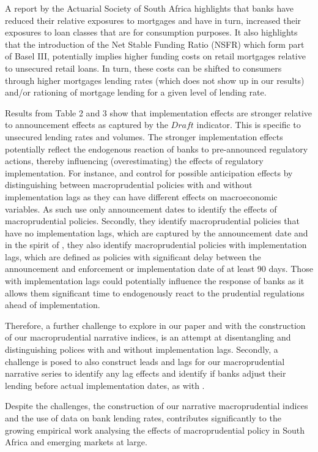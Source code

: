 \documentclass[
  letterpaper,
  DIV=11,
  numbers=noendperiod]{scrartcl}
\begin{document}
A report by the Actuarial Society of South Africa highlights that banks
have reduced their relative exposures to mortgages and have in turn,
increased their exposures to loan classes that are for consumption
purposes. It also highlights that the introduction of the Net Stable
Funding Ratio (NSFR) which form part of Basel III, potentially implies
higher funding costs on retail mortgages relative to unsecured retail
loans. In turn, these costs can be shifted to consumers through higher
mortgages lending rates (which does not show up in our results) and/or
rationing of mortgage lending for a given level of lending rate.

Results from Table 2 and 3 show that implementation effects are stronger
relative to announcement effects as captured by the \(Draft\) indicator.
This is specific to unsecured lending rates and volumes. The stronger
implementation effects potentially reflect the endogenous reaction of
banks to pre-announced regulatory actions, thereby influencing
(overestimating) the effects of regulatory implementation. For instance,
\cite{fernandez2023transmission} and \cite{fang2022bank} control for
possible anticipation effects by distinguishing between macroprudential
policies with and without implementation lags as they can have different
effects on macroeconomic variables. As such
\cite{fernandez2023transmission} use only announcement dates to identify
the effects of macroprudential policies. Secondly, they identify
macroprudential policies that have no implementation lags, which are
captured by the announcement date and in the spirit of
\cite{mertens2012empirical}, they also identify macroprudential policies
with implementation lags, which are defined as policies with significant
delay between the announcement and enforcement or implementation date of
at least 90 days. Those with implementation lags could potentially
influence the response of banks as it allows them significant time to
endogenously react to the prudential regulations ahead of
implementation.

Therefore, a further challenge to explore in our paper and with the
construction of our macroprudential narrative indices, is an attempt at
disentangling and distinguishing polices with and without implementation
lags. Secondly, a challenge is posed to also construct leads and lags
for our macroprudential narrative series to identify any lag effects and
identify if banks adjust their lending before actual implementation
dates, as with \cite{fang2022bank}.

Despite the challenges, the construction of our narrative
macroprudential indices and the use of data on bank lending rates,
contributes significantly to the growing empirical work analysing the
effects of macroprudential policy in South Africa and emerging markets
at large.
\end{document}
